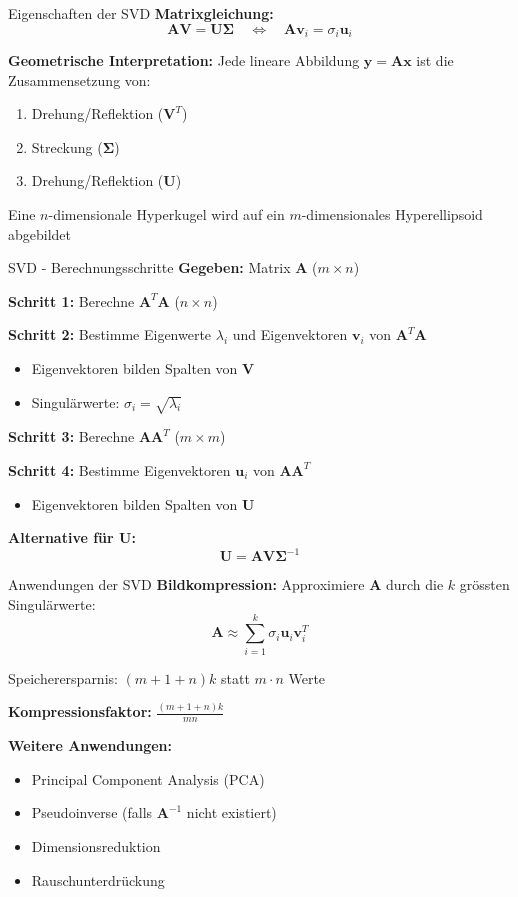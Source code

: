 \documentclass[a4paper, fontsize=7pt]{scrartcl}
\begin{document}
\begin{mainbox}{Eigenschaften der SVD}
\textbf{Matrixgleichung:}
$$\mathbf{AV} = \mathbf{U\Sigma} \quad \Leftrightarrow \quad \mathbf{A}\mathbf{v}_i = \sigma_i\mathbf{u}_i$$

\textbf{Geometrische Interpretation:}
Jede lineare Abbildung $\mathbf{y} = \mathbf{Ax}$ ist die Zusammensetzung von:
\begin{enumerate}
    \item Drehung/Reflektion ($\mathbf{V}^T$)
    \item Streckung ($\mathbf{\Sigma}$)
    \item Drehung/Reflektion ($\mathbf{U}$)
\end{enumerate}

Eine $n$-dimensionale Hyperkugel wird auf ein $m$-dimensionales Hyperellipsoid abgebildet
\end{mainbox}

\begin{subbox}{SVD - Berechnungsschritte}
\textbf{Gegeben:} Matrix $\mathbf{A}$ ($m \times n$)

\textbf{Schritt 1:} Berechne $\mathbf{A}^T\mathbf{A}$ ($n \times n$)

\textbf{Schritt 2:} Bestimme Eigenwerte $\lambda_i$ und Eigenvektoren $\mathbf{v}_i$ von $\mathbf{A}^T\mathbf{A}$
\begin{itemize}
    \item Eigenvektoren bilden Spalten von $\mathbf{V}$
    \item Singulärwerte: $\sigma_i = \sqrt{\lambda_i}$
\end{itemize}

\textbf{Schritt 3:} Berechne $\mathbf{AA}^T$ ($m \times m$)

\textbf{Schritt 4:} Bestimme Eigenvektoren $\mathbf{u}_i$ von $\mathbf{AA}^T$
\begin{itemize}
    \item Eigenvektoren bilden Spalten von $\mathbf{U}$
\end{itemize}

\textbf{Alternative für $\mathbf{U}$:}
$$\mathbf{U} = \mathbf{AV\Sigma}^{-1}$$
\end{subbox}

\begin{subbox}{Anwendungen der SVD}
\textbf{Bildkompression:}
Approximiere $\mathbf{A}$ durch die $k$ grössten Singulärwerte:
$$\mathbf{A} \approx \sum_{i=1}^{k} \sigma_i\mathbf{u}_i\mathbf{v}_i^T$$

Speicherersparnis: $(m + 1 + n)k$ statt $m \cdot n$ Werte

\textbf{Kompressionsfaktor:} $\frac{(m + 1 + n)k}{mn}$

\textbf{Weitere Anwendungen:}
\begin{itemize}
    \item Principal Component Analysis (PCA)
    \item Pseudoinverse (falls $\mathbf{A}^{-1}$ nicht existiert)
    \item Dimensionsreduktion
    \item Rauschunterdrückung
\end{itemize}
\end{subbox}
\end{document}
